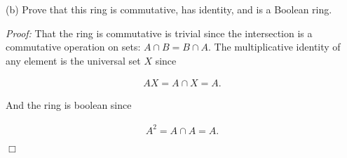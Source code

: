 \documentclass{article}
\begin{document}
  \vspace{1cm}

  {\Large \color{Sepia} (b)  Prove that this ring is commutative, has identity, and is a Boolean ring.}

  {\it Proof:}  That the ring is commutative is trivial since the intersection is a commutative operation on sets: $A\cap B = B\cap A$.  The multiplicative identity of any element is the universal set $X$ since

  \begin{align*}
    AX = A\cap X = A.
  \end{align*}

  And the ring is boolean since

  \begin{align*}
    A^2 = A\cap A = A.
  \end{align*}

  $\Box$
\end{document}
